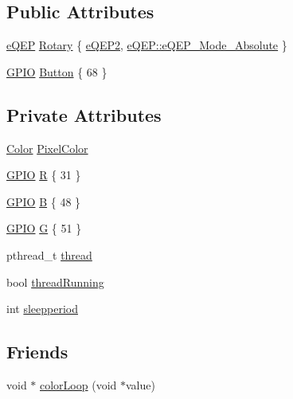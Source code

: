 \subsection*{Public Attributes}
\begin{DoxyCompactItemize}
\item 
\hyperlink{class_hardware_1_1e_q_e_p}{e\+Q\+E\+P} \hyperlink{class_hardware_1_1_e_c12_p_abfe8d6ea8948c77d4866ca8a05dbebe9}{Rotary} \{ \hyperlink{eqep_8h_a2dfbafc696aef9c14226ce25fb77c5f1}{e\+Q\+E\+P2}, \hyperlink{class_hardware_1_1e_q_e_p_a3f97f26c64d49d6f2643a257b7249070a5e916ce9f21af5bd9c5c63609630df7e}{e\+Q\+E\+P\+::e\+Q\+E\+P\+\_\+\+Mode\+\_\+\+Absolute} \}
\item 
\hyperlink{class_hardware_1_1_g_p_i_o}{G\+P\+I\+O} \hyperlink{class_hardware_1_1_e_c12_p_a6d91a7b1767f080af8c33bacdae1dd1d}{Button} \{ 68 \}
\end{DoxyCompactItemize}
\subsection*{Private Attributes}
\begin{DoxyCompactItemize}
\item 
\hyperlink{class_hardware_1_1_e_c12_p_a8341f410cd939bf03160fe239bc782aa}{Color} \hyperlink{class_hardware_1_1_e_c12_p_a1bc6223c152c6d9f30304b92069f05c0}{Pixel\+Color}
\item 
\hyperlink{class_hardware_1_1_g_p_i_o}{G\+P\+I\+O} \hyperlink{class_hardware_1_1_e_c12_p_a0a4f03a37d709349994e800e44f5c781}{R} \{ 31 \}
\item 
\hyperlink{class_hardware_1_1_g_p_i_o}{G\+P\+I\+O} \hyperlink{class_hardware_1_1_e_c12_p_a326f00b2047ecb58ee1e7e894dc61ad3}{B} \{ 48 \}
\item 
\hyperlink{class_hardware_1_1_g_p_i_o}{G\+P\+I\+O} \hyperlink{class_hardware_1_1_e_c12_p_a7afd63c14e12d861c8b20614ef34d70e}{G} \{ 51 \}
\item 
pthread\+\_\+t \hyperlink{class_hardware_1_1_e_c12_p_a718a90836ff46cd71d18ce099a656533}{thread}
\item 
bool \hyperlink{class_hardware_1_1_e_c12_p_a81af8167f5a5192d8575ebad04952d57}{thread\+Running}
\item 
int \hyperlink{class_hardware_1_1_e_c12_p_adff7ed51fd97bac61075c88a06102348}{sleepperiod}
\end{DoxyCompactItemize}
\subsection*{Friends}
\begin{DoxyCompactItemize}
\item 
void $\ast$ \hyperlink{class_hardware_1_1_e_c12_p_ae57007919c8fb89fc45e952de846c90e}{color\+Loop} (void $\ast$value)
\end{DoxyCompactItemize}


